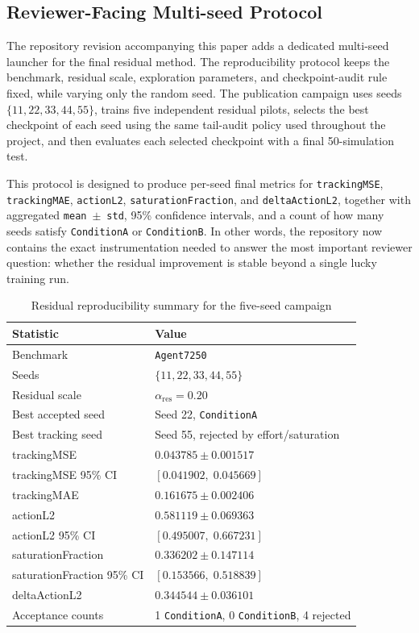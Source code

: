 \documentclass[conference]{IEEEtran}
\begin{document}
\subsection{Reviewer-Facing Multi-seed Protocol}
The repository revision accompanying this paper adds a dedicated multi-seed launcher for the final residual method. The reproducibility protocol keeps the benchmark, residual scale, exploration parameters, and checkpoint-audit rule fixed, while varying only the random seed. The publication campaign uses seeds $\{11,22,33,44,55\}$, trains five independent residual pilots, selects the best checkpoint of each seed using the same tail-audit policy used throughout the project, and then evaluates each selected checkpoint with a final 50-simulation test.

This protocol is designed to produce per-seed final metrics for \texttt{trackingMSE}, \texttt{trackingMAE}, \texttt{actionL2}, \texttt{saturationFraction}, and \texttt{deltaActionL2}, together with aggregated \texttt{mean}~$\pm$~\texttt{std}, 95\% confidence intervals, and a count of how many seeds satisfy \texttt{ConditionA} or \texttt{ConditionB}. In other words, the repository now contains the exact instrumentation needed to answer the most important reviewer question: whether the residual improvement is stable beyond a single lucky training run.

\begin{table}[t]
\centering
\caption{Residual reproducibility summary for the five-seed campaign}
\label{tab:multiseed-results}
\footnotesize
\begin{tabularx}{\columnwidth}{L{2.15cm}Y}
\toprule
Statistic & Value \\
\midrule
Benchmark & \texttt{Agent7250} \\
Seeds & $\{11, 22, 33, 44, 55\}$ \\
Residual scale & $\alpha_{\mathrm{res}} = 0.20$ \\
Best accepted seed & Seed 22, \texttt{ConditionA} \\
Best tracking seed & Seed 55, rejected by effort/saturation \\ 
trackingMSE & $0.043785 \pm 0.001517$ \\
trackingMSE 95\% CI & $[0.041902,\; 0.045669]$ \\
trackingMAE & $0.161675 \pm 0.002406$ \\
actionL2 & $0.581119 \pm 0.069363$ \\
actionL2 95\% CI & $[0.495007,\; 0.667231]$ \\
saturationFraction & $0.336202 \pm 0.147114$ \\
saturationFraction 95\% CI & $[0.153566,\; 0.518839]$ \\
deltaActionL2 & $0.344544 \pm 0.036101$ \\
Acceptance counts & 1 \texttt{ConditionA}, 0 \texttt{ConditionB}, 4 rejected \\
\bottomrule
\end{tabularx}
\end{table}
\end{document}
